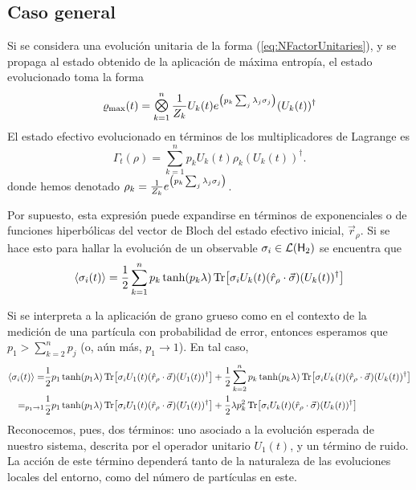 \subsection{Caso general}

Si se considera una evolución unitaria de la forma (\ref{eq:NFactorUnitaries}), y se propaga al estado obtenido de la aplicación de máxima entropía, el estado evolucionado toma la forma
\begin{equation*}
    \varrho_{\max}(t)=\Motimes_{k=1}^{n}\frac{1}{Z_{k}}U_{k}(t) e^{\qty(p_{k}\sum_{j}\lambda_{j}\pauli{j})} (U_{k}(t))^{\dag}
\end{equation*}
El estado efectivo evolucionado en términos de los multiplicadores de Lagrange es
\begin{equation}\label{eq:SeparableEvolution}
    \Gamma_{t}(\rho)=\sum_{k=1}^{n}p_{k} U_{k}(t) \rho_{k} (U_{k}(t))^{\dag}.
\end{equation}
donde hemos denotado $\rho_{k}=\frac{1}{Z_{k}}e^{\qty(p_{k}\sum_{j}\lambda_{j}\sigma_{j})}$. 

Por supuesto, esta expresión puede expandirse en términos de exponenciales o de funciones hiperbólicas del vector de Bloch del estado efectivo inicial, $\vec{r}_{\rho}$. Si se hace esto para hallar la evolución de un observable $\sigma_{i}\in\mathcal{L}({\sf H}_{2})$ se encuentra que
\begin{equation}\label{eq:SeparableEvolutionExpVal}
    \expval{\sigma_{i}(t)}=\frac{1}{2}\sum_{k=1}^{n}p_{k}\tanh(p_{k}\lambda)\Tr[\sigma_{i}U_{k}(t) (\hat{r}_{\rho}\cdot\vec{\sigma}) (U_{k}(t))^{\dag}]
\end{equation}

Si se interpreta a la aplicación de grano grueso como en el contexto de la medición de una partícula con probabilidad de error, entonces esperamos que  $p_{1}>\sum_{k=2}^{n}p_{j}$ (o, aún más, $p_{1}\rightarrow 1$). En tal caso, 
\begin{align*}
    \expval{\sigma_{i}(t)}=&\frac{1}{2}p_{1}\tanh(p_{1}\lambda)\Tr[\sigma_{i}U_{1}(t) (\hat{r}_{\rho}\cdot\vec{\sigma}) (U_{1}(t))^{\dag}]+\frac{1}{2}\sum_{k=2}^{n}p_{k}\tanh(p_{k}\lambda)\Tr[\sigma_{i}U_{k}(t) (\hat{r}_{\rho}\cdot\vec{\sigma}) (U_{k}(t))^{\dag}]\\
    =_{p_{1}\rightarrow 1}&\frac{1}{2}p_{1}\tanh(p_{1}\lambda)\Tr[\sigma_{i}U_{1}(t) (\hat{r}_{\rho}\cdot\vec{\sigma}) (U_{1}(t))^{\dag}]+\frac{1}{2}\lambda p_{k}^{2}\Tr[\sigma_{i}U_{k}(t) (\hat{r}_{\rho}\cdot\vec{\sigma}) (U_{k}(t))^{\dag}]
\end{align*}
Reconocemos, pues, dos términos: uno asociado a la evolución esperada de nuestro sistema, descrita por el operador unitario $U_{1}(t)$, y un término de ruido. La acción de este término dependerá tanto de la naturaleza de las evoluciones locales del entorno, como del número de partículas en este.


